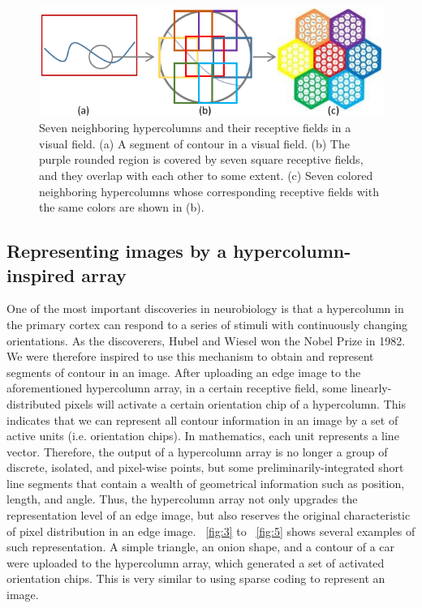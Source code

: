 \documentclass[journal]{IEEEtran}
\begin{document}
\begin{figure}[!t]
\centering
\includegraphics[width=\linewidth]{images/fig2.pdf}
\caption{Seven neighboring hypercolumns and their receptive fields in a visual field. 
(a) A segment of contour in a visual field. 
(b) The purple rounded region is covered by seven square receptive fields, 
and they overlap with each other to some extent. 
(c) Seven colored neighboring hypercolumns whose corresponding receptive fields with the same colors 
are shown in (b).}
\label{fig:2}
\end{figure}

\subsection{Representing images by a hypercolumn-inspired array}

One of the most important discoveries in neurobiology is that a hypercolumn in the primary cortex can respond to a series of stimuli with continuously changing orientations. 
As the discoverers, Hubel and Wiesel won the Nobel Prize in 1982. 
We were therefore inspired to use this mechanism to obtain and represent segments of contour in an image. 
After uploading an edge image to the aforementioned hypercolumn array, 
in a certain receptive field, 
some linearly-distributed pixels will activate a certain orientation chip of a hypercolumn. 
This indicates that we can represent all contour information in an image by a set of active units (i.e. orientation chips). In mathematics, each unit represents a line vector. Therefore, the output of a hypercolumn array is no longer a group of discrete, isolated, and pixel-wise points, 
but some preliminarily-integrated short line segments that contain a wealth of geometrical information such as position, length, and angle. 
Thus, the hypercolumn array not only upgrades the representation level of an edge image, 
but also reserves the original characteristic of pixel distribution in an edge image. 
\figurename~\ref{fig:3} to \figurename~\ref{fig:5} shows several examples of such representation.
A simple triangle, an onion shape, and a contour of a car were uploaded to the hypercolumn array,
which generated a set of activated orientation chips.
This is very similar to using sparse coding to represent an image.
\end{document}
